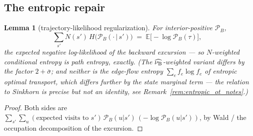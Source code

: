 \documentclass[11pt]{article}
\newtheorem{lemma}[theorem]{Lemma}
\theoremstyle{definition}
\theoremstyle{remark}
\def\lambda{\widehat\nuB}
\begin{document}
\subsection{The entropic repair}\label{sec:entropic_notes}

\begin{lemma}[trajectory-likelihood regularization]\label{lem:traj_entropy_notes}
For interior-positive $\mathcal P_B$,
\begin{equation*}
    \sum_{s'} N(s')\,H\bigl(\mathcal P_B(\cdot\,|\,s')\bigr)
    \;=\; \mathbb E\bigl[-\log \mathcal P_B(\tau)\bigr],
\end{equation*}
the expected negative log-likelihood of the backward excursion --- so $N$-weighted
conditional entropy is \emph{path} entropy, exactly. (The $\lambda$-weighted variant
differs by the factor $2+\bar\sigma$; and neither is the edge-flow entropy
$\sum_e f_e\log f_e$ of entropic optimal transport, which differs further by the state
marginal term --- the relation to Sinkhorn is precise but not an identity, see
Remark~\ref{rem:entropic_ot_notes}.)
\end{lemma}

\begin{proof}
Both sides are $\sum_{s'}\sum_u (\text{expected visits to } s')\,
\mathcal P_B(u|s')\allowbreak\,(-\log\mathcal P_B(u|s'))$, by Wald / the occupation
decomposition of the excursion.
\end{proof}
\end{document}
